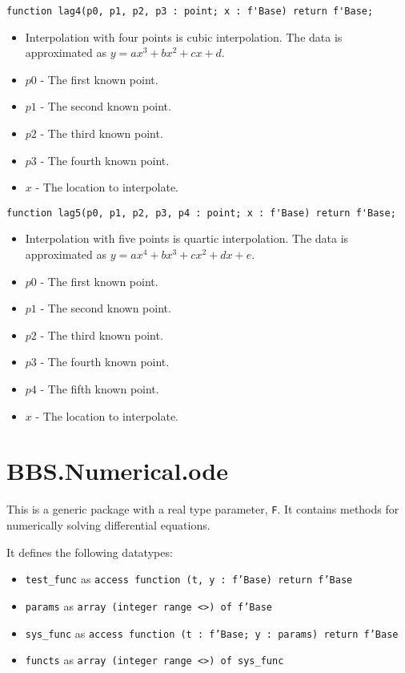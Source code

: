 \documentclass[10pt, openany]{book}
\newcommand{\datatype}[1]{\texttt{#1}}
\begin{document}
\begin{lstlisting}
function lag4(p0, p1, p2, p3 : point; x : f'Base) return f'Base;
\end{lstlisting}
\begin{itemize}
  \item Interpolation with four points is cubic interpolation.  The data is approximated as $y = ax^3+bx^2+cx+d$.
  \item $p0$ - The first known point.
  \item $p1$ - The second known point.
  \item $p2$ - The third known point.
  \item $p3$ - The fourth known point.
  \item $x$ - The location to interpolate.
\end{itemize}

\begin{lstlisting}
function lag5(p0, p1, p2, p3, p4 : point; x : f'Base) return f'Base;
\end{lstlisting}
\begin{itemize}
  \item Interpolation with five points is quartic interpolation.  The data is approximated as $y = ax^4+bx^3+cx^2+dx+e$.
  \item $p0$ - The first known point.
  \item $p1$ - The second known point.
  \item $p2$ - The third known point.
  \item $p3$ - The fourth known point.
  \item $p4$ - The fifth known point.
  \item $x$ - The location to interpolate.
\end{itemize}

\section{BBS.Numerical.ode}
This is a generic package with a real type parameter, \datatype{F}.  It contains methods for numerically solving differential equations.

It defines the following datatypes:
\begin{itemize}
   \item \datatype{test\_func} as \datatype{access function (t, y : f'Base) return f'Base}
   \item \datatype{params} as \datatype{array (integer range <>) of f'Base}
   \item \datatype{sys\_func} as \datatype{access function (t : f'Base; y : params) return f'Base}
   \item \datatype{functs} as \datatype{array (integer range <>) of sys\_func}
\end{itemize}
\end{document}
